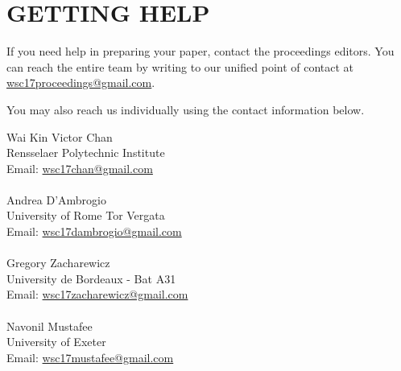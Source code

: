 \documentclass{wscposterproc}
\begin{document}
\section{GETTING HELP}
If you need help in preparing your paper, contact the proceedings editors. You can reach the entire team by writing to our unified point of contact at \href{mailto://wsc17proceedings@gmail.com}{wsc17proceedings@gmail.com}.

You may also reach us individually using the contact information below.

\vspace{6pt}

\noindent Wai Kin Victor Chan\\
Rensselaer Polytechnic Institute\\
Email: \href{mailto://wsc17chan@gmail.com}{wsc17chan@gmail.com}\\
\\
Andrea D'Ambrogio\\
University of Rome Tor Vergata\\
Email: \href{mailto://wsc17dambrogio@gmail.com}{wsc17dambrogio@gmail.com}\\
\\
Gregory Zacharewicz\\
University de Bordeaux - Bat A31\\
Email: \href{mailto://wsc17zacharewicz@gmail.com}{wsc17zacharewicz@gmail.com}\\
\\
Navonil Mustafee\\
University of Exeter\\
Email: \href{mailto://wsc17mustafee@gmail.com}{wsc17mustafee@gmail.com}\\
\\


\end{document}
